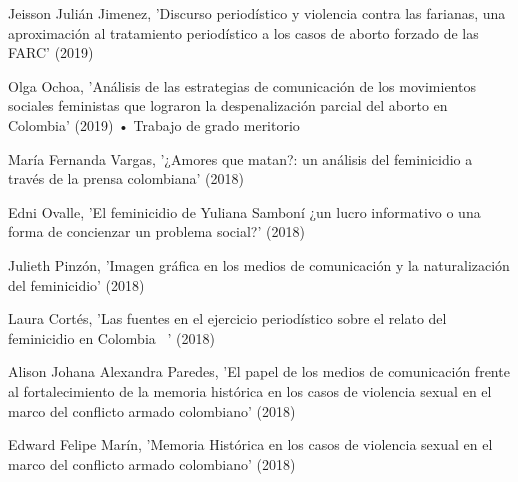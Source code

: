 \documentclass[11pt,a4paper,]{awesome-cv}
\begin{document}
\begin{cventries}
{\begin{cvitems}
\item Jeisson Julián Jimenez, 'Discurso periodístico y violencia contra las farianas, una aproximación al tratamiento periodístico a los casos de aborto forzado de las FARC' (2019)
\item Olga Ochoa, 'Análisis de las estrategias de comunicación de los movimientos sociales feministas que lograron la despenalización parcial del aborto en Colombia' (2019) • Trabajo de grado meritorio
\item María Fernanda Vargas, '¿Amores que matan?: un análisis del feminicidio a través de la prensa colombiana' (2018)
\item Edni Ovalle, 'El feminicidio de Yuliana Samboní ¿un lucro informativo o una forma de concienzar un problema social?' (2018)
\item Julieth Pinzón, 'Imagen gráfica en los medios de comunicación y la naturalización del feminicidio' (2018)
\item Laura Cortés, 'Las fuentes en el ejercicio periodístico sobre el relato del feminicidio en Colombia  ' (2018)
\item Alison Johana Alexandra Paredes, 'El papel de los medios de comunicación frente al fortalecimiento de la memoria histórica en los casos de violencia sexual en el marco del conflicto armado colombiano' (2018)
\item Edward Felipe Marín, 'Memoria Histórica en los casos de violencia sexual en el marco del conflicto armado colombiano' (2018)
\end{cvitems}}
\end{cventries}
\end{document}
